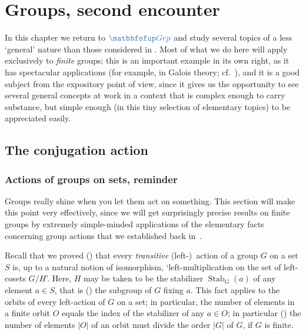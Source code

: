 \chapter{Groups, second encounter}
\label{chap:groups2}

In this chapter we return to $\categ{Grp}$ and study several topics of
a less `general' nature than those considered in
\@. Most of what we do here will apply exclusively
to \emph{finite} groups; this is an important example in its own
right, as it has spectacular applications (for example, in Galois
theory; cf.\
),
and it is a good subject from the expository point of view, since it
gives us the opportunity to see several general concepts at work in a
context that is complex enough to carry substance, but simple enough
(in this tiny selection of elementary topics) to be appreciated
easily.

\section{The conjugation action}
\label{sec:groups2:the-conjugation-action}


\subsection{Actions of groups on sets, reminder}
\label{subsec:groups2:actions-of-groups-on-sets-reminder}
Groups really shine when you let them act on something. This section
will make this point very effectively, since we will get surprisingly
precise results on finite groups by extremely simple-minded
applications of the elementary facts concerning group actions that we
established back in~\Cref{sec:groups:group-actions}.

Recall that we proved
() that every
\emph{transitive} (left-)~action of a group $G$ on a set $S$ is, up to
a natural notion of isomorphism, `left-multiplication on the set of
left-cosets $G/H$'. Here, $H$ may be taken to be the stabilizer
$\operatorname{Stab}_G(a)$ of any element $a \in S$, that is
() the subgroup of $G$ fixing $a$. This
fact applies to the orbits of every left-action of $G$ on a set; in
particular, the number of elements in a finite orbit $O$ equals the
index of the stabilizer of any $a \in O$; in particular
() the number of elements $|O|$
of an orbit must divide the order $|G|$ of $G$, if $G$ is finite.

